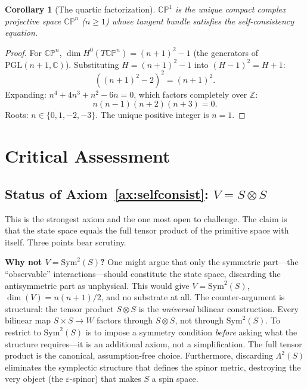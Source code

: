 \documentclass[11pt,a4paper]{article}
\newtheorem{corollary}[theorem]{Corollary}
\theoremstyle{definition}
\theoremstyle{remark}
\newcommand{\CP}{\mathbb{CP}}
\newcommand{\C}{\mathbb{C}}
\newcommand{\Z}{\mathbb{Z}}
\newcommand{\Sym}{\mathrm{Sym}}
\newcommand{\PGL}{\mathrm{PGL}}
\begin{document}
\begin{corollary}[The quartic factorization]\label{cor:quartic}
$\CP^1$ is the unique compact complex projective space $\CP^n$
($n\geq 1$) whose tangent bundle satisfies the self-consistency
equation.
\end{corollary}

\begin{proof}
For $\CP^n$, $\dim H^0(T\CP^n)=(n+1)^2-1$ (the generators of
$\PGL(n+1,\C)$).
Substituting $H=(n+1)^2-1$ into $(H-1)^2=H+1$:
\[
((n+1)^2-2)^2 = (n+1)^2.
\]
Expanding: $n^4+4n^3+n^2-6n=0$, which factors completely over $\Z$:
\[
n(n-1)(n+2)(n+3)=0.
\]
Roots: $n\in\{0,1,-2,-3\}$. The unique positive integer is $n=1$.
\end{proof}

\section{Critical Assessment}\label{sec:critical}

\subsection{Status of Axiom~\ref{ax:selfconsist}: $V=S\otimes S$}

This is the strongest axiom and the one most open to challenge.
The claim is that the state space equals the full tensor product of the
primitive space with itself.
Three points bear scrutiny.

\textbf{Why not $V=\Sym^2(S)$?}
One might argue that only the symmetric part---the ``observable''
interactions---should constitute the state space, discarding the
antisymmetric part as unphysical.
This would give $V=\Sym^2(S)$, $\dim(V)=n(n+1)/2$, and no substrate
at all.
The counter-argument is structural: the tensor product $S\otimes S$ is
the \emph{universal} bilinear construction.
Every bilinear map $S\times S\to W$ factors through $S\otimes S$, not
through $\Sym^2(S)$.
To restrict to $\Sym^2(S)$ is to impose a symmetry condition
\emph{before} asking what the structure requires---it is an additional
axiom, not a simplification.
The full tensor product is the canonical, assumption-free choice.
Furthermore, discarding $\Lambda^2(S)$ eliminates the symplectic
structure that defines the spinor metric, destroying the very object
(the $\varepsilon$-spinor) that makes $S$ a spin space.
\end{document}
